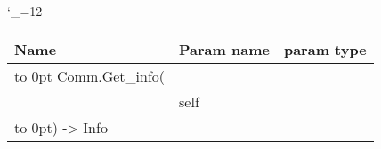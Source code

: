 \begingroup \catcode`\_=12 \tt
\begin{tabular}{lll}
\toprule
\textrm{Name}&\textrm{Param name}&\textrm{param type}\\
\midrule
\hbox to 0pt {Comm.Get_info(\hss}\\
& self\\
\hbox to 0pt{) -> Info\hss}\\
\bottomrule
\end{tabular}
\endgroup

